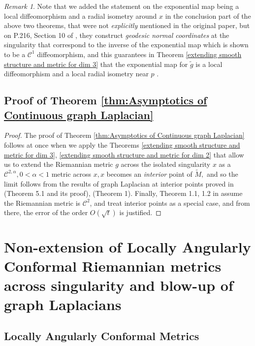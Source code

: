 \documentclass{amsart}
\let\oldcitet\citet
\renewcommand{\citet}[1]{\textcolor{blue}{\oldcitet{#1}}}
\theoremstyle{definition}
\theoremstyle{remark}
\newtheorem{remark}[theorem]{Remark}
\newcommand{\0}{\boldsymbol{0}}
\def\cC{\mathcal C}
\begin{document}
\begin{remark}
    Note that we added the statement on the exponential map being a local diffeomorphism and a radial isometry around $x$ in the conclusion part of the above two theorems, that were not \textit{explicitly} mentioned in the original paper, but on P.216, Section 10 of \citet{SmithYang1992}, they construct \textit{geodesic normal coordinates} at the singularity that correspond to the inverse of the exponential map which is shown to be a $\cC^1$ diffeomorphism, and this guarantees in Theorem \ref{extending smooth structure and metric for dim 3} that the exponential map for $\tilde{g}$ is a local diffeomorphism and a local radial isometry near $p$ . 
\end{remark} 


\subsection{Proof of Theorem \ref{thm:Asymptotics of Continuous graph Laplacian}}

\begin{proof}
  The proof of Theorem \ref{thm:Asymptotics of Continuous graph Laplacian} follows at once when we apply the Theorems \ref{extending smooth structure and metric for dim 3}, \ref{extending smooth structure and metric for dim 2} that allow us to extend the Riemannian metric $g$ across the isolated singularity $x$ as a $\cC^{2,\alpha}, 0< \alpha < 1$ metric across $x, x$ becomes an \textit{interior} point of $\widetilde{M},$ and so the limit follows from the results of graph Laplacian at interior points proved in  \citet{BelkinNiyogiCOLT2005} (Theorem 5.1 and its proof), \citet{HeinAudibertLuxburgNIPS2005} (Theorem 1). Finally, Theorem 1.1, 1.2 in \citet{PalTewodrose2025} assume the Riemannian metric is $\cC^2$, and treat interior points as a special case, and from there, the error of the order $O(\sqrt{t})$ is justified. 
\end{proof}


\section{Non-extension of Locally Angularly Conformal Riemannian metrics across singularity and blow-up of graph Laplacians} \label{scn:non-extn}

\subsection{Locally Angularly Conformal Metrics}
\end{document}
